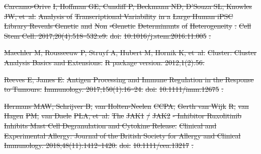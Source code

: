 \documentclass[10pt,letterpaper]{article}
\providecommand{\DIFdeltex}[1]{{\protect\color{red}\sout{#1}}}                      %
\providecommand{\DIFdel}[1]{\texorpdfstring{\DIFdeltex{#1}}{}} %
\begin{document}
\begin{thebibliography}{10}
\DIFdel{Carcamo-Orive}%
\DIFdel{I, Hoffman GE, Cundiff P, Beckmann ND, D'Souza SL, Knowles JW,
	et~al.
	}%
\DIFdel{Analysis of }%
\DIFdel{Transcriptional Variability}%
\DIFdel{in a }%
\DIFdel{Large Human iPSC
			Library Reveals Genetic}%
\DIFdel{and }%
\DIFdel{Non}%
\DIFdel{-Genetic }%
\DIFdel{Determinants}%
\DIFdel{of
	}%
\DIFdel{Heterogeneity}%
\DIFdel{.
	}%
\DIFdel{Cell Stem Cell. 2017;20(4):518--532.e9.
	}%
\DIFdel{doi:}%
\DIFdel{10.1016/j.stem.2016.11.005}%
\DIFdel{.
	}%

\DIFdel{Maechler M, Rousseeuw P, Struyf A, Hubert M, Hornik K, et~al.
	}%
\DIFdel{Cluster: Cluster Analysis Basics and Extensions.
	}%
\DIFdel{R package version. 2012;1(2):56.
	}%

\DIFdel{Reeves E, James E.
	}%
\DIFdel{Antigen Processing and Immune Regulation in the Response to Tumours.
	}%
\DIFdel{Immunology. 2017;150(1):16--24.
	}%
\DIFdel{doi:}%
\DIFdel{10.1111/imm.12675}%
\DIFdel{.
	}%

\DIFdel{Hermans MAW, Schrijver B, }%
\DIFdel{van Holten-Neelen}%
\DIFdel{CCPA, }%
\DIFdel{Gerth van Wijk}%
\DIFdel{R, }%
\DIFdel{van
		Hagen}%
\DIFdel{PM, }%
\DIFdel{van Daele}%
\DIFdel{PLA, et~al.
	}%
\DIFdel{The }%
\DIFdel{JAK1}%
\DIFdel{/}%
\DIFdel{JAK2}%
\DIFdel{- Inhibitor Ruxolitinib Inhibits Mast Cell
	Degranulation and Cytokine Release.
	}%
\DIFdel{Clinical and Experimental Allergy: Journal of the British Society for
	Allergy and Clinical Immunology. 2018;48(11):1412--1420.
	}%
\DIFdel{doi:}%
\DIFdel{10.1111/cea.13217}%
\DIFdel{.
	}%


\end{thebibliography}
\end{document}
